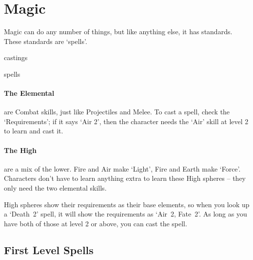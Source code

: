 \chapter[Chamber of Magic]{Magic}
\label{spellsChapter}
\toggletrue{examplecharacter}

\begin{multicols}{2}

\noindent
Magic can do any number of things, but like anything else, it has standards.
These standards are `spells'.

\Glspl{casting}

\Glspl{spell}

\subsubsection{The Elemental }
are Combat \glspl{skill}, just like Projectiles and Melee.
To cast a spell, check the `Requirements'; if it says `Air 2', then the character needs the `Air' \gls{skill} at level 2 to learn and cast it.

\subsubsection{The High }
are a mix of the lower.
Fire and Air make `Light', Fire and Earth make `Force'.
Characters don't have to learn anything extra to learn these High \glspl{sphere} -- they only need the two elemental \glspl{skill}.

High \glspl{sphere} show their requirements as their base elements, so when you look up a `Death~2' spell, it will show the requirements as `Air~2, Fate~2'.
As long as you have both of those at level 2 or above, you can cast the spell.

\end{multicols}

\section{First Level Spells}


